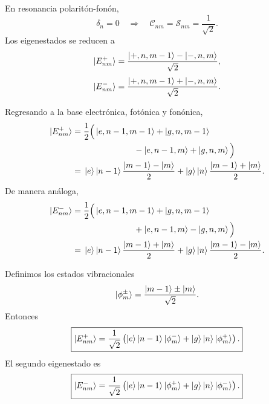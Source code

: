 \documentclass[11pt]{article}
\begin{document}
En resonancia polarit\'on-fon\'on,
\begin{equation}
  \delta_n=0
  \quad\Longrightarrow\quad
  \mathcal C_{nm}=\mathcal S_{nm}=\frac1{\sqrt2}.
\end{equation}
Los eigenestados se reducen a
\begin{equation}
  \ket{E_{nm}^{+}}
  =
  \frac{
  \ket{+,n,m-1}-\ket{-,n,m}
  }{\sqrt2},
\end{equation}
\begin{equation}
  \ket{E_{nm}^{-}}
  =
  \frac{
  \ket{+,n,m-1}+\ket{-,n,m}
  }{\sqrt2}.
\end{equation}

Regresando a la base electr\'onica, fot\'onica y fon\'onica,
\begin{equation}
\begin{aligned}
  \ket{E_{nm}^{+}}
  ={}&
  \frac12
  \Big(
  \ket{e,n-1,m-1}
  +
  \ket{g,n,m-1}
  \\
  &\hspace{2.1cm}
  -
  \ket{e,n-1,m}
  +
  \ket{g,n,m}
  \Big)
  \\
  ={}&
  \ket e\ket{n-1}
  \frac{\ket{m-1}-\ket m}{2}
  +
  \ket g\ket n
  \frac{\ket{m-1}+\ket m}{2}.
\end{aligned}
\end{equation}
De manera an\'aloga,
\begin{equation}
\begin{aligned}
  \ket{E_{nm}^{-}}
  ={}&
  \frac12
  \Big(
  \ket{e,n-1,m-1}
  +
  \ket{g,n,m-1}
  \\
  &\hspace{2.1cm}
  +
  \ket{e,n-1,m}
  -
  \ket{g,n,m}
  \Big)
  \\
  ={}&
  \ket e\ket{n-1}
  \frac{\ket{m-1}+\ket m}{2}
  +
  \ket g\ket n
  \frac{\ket{m-1}-\ket m}{2}.
\end{aligned}
\end{equation}

Definimos los estados vibracionales
\begin{equation}
  \ket{\phi_m^{\pm}}
  =
  \frac{\ket{m-1}\pm\ket m}{\sqrt2}.
\end{equation}
Entonces
\begin{equation}
  \boxed{
  \ket{E_{nm}^{+}}
  =
  \frac1{\sqrt2}
  \left(
  \ket e\ket{n-1}\ket{\phi_m^{-}}
  +
  \ket g\ket n\ket{\phi_m^{+}}
  \right).
  }
\end{equation}
El segundo eigenestado es
\begin{equation}
  \boxed{
  \ket{E_{nm}^{-}}
  =
  \frac1{\sqrt2}
  \left(
  \ket e\ket{n-1}\ket{\phi_m^{+}}
  +
  \ket g\ket n\ket{\phi_m^{-}}
  \right).
  }
\end{equation}
\end{document}
